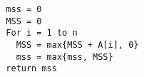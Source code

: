 
\begin{verbatim}
  mss = 0
  MSS = 0
  For i = 1 to n
    MSS = max{MSS + A[i], 0}
    mss = max{mss, MSS}
  return mss
\end{verbatim}
